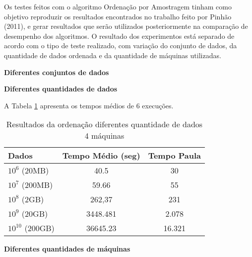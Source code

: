 Os testes feitos com o algoritmo Ordenação por Amostragem tinham como objetivo reproduzir os resultados encontrados no trabalho feito por Pinhão (2011), e gerar resultados 
que serão utilizados posteriormente na comparação de desempenho dos algoritmos. 
O resultado dos experimentos está separado de acordo com o tipo de teste realizado, com variação do conjunto de dados, da quantidade de dados ordenada e da quantidade de máquinas utilizadas. 

\noindent
\textbf{Diferentes conjuntos de dados}

\noindent
\textbf{Diferentes quantidades de dados}

A Tabela \ref{tab:QuantidadeDados} apresenta os tempos médios de 6 execuções. 

\begin{table}[htbp]
\caption{Resultados da ordenação diferentes quantidade de dados 4 máquinas}
\begin{center}
\begin{tabular}{|l|cc|} \hline
Dados 						&Tempo Médio (seg)		&Tempo Paula	\\ \hline \hline
$10^{6}$ (20MB)	 	&40.5								&30				\\ \hline 
$10^{7}$ (200MB)	&59.66								&55				\\ \hline 
$10^{8}$ (2GB)	 		&262,37							&231			\\ \hline 
$10^{9}$ (20GB)	&3448.481						&2.078			\\ \hline 
$10^{10}$ (200GB) 	&36645.23						&16.321		\\ \hline 
\end{tabular}
\end{center}
\label{tab:QuantidadeDados}
\end{table}

\noindent
\textbf{Diferentes quantidades de máquinas}

